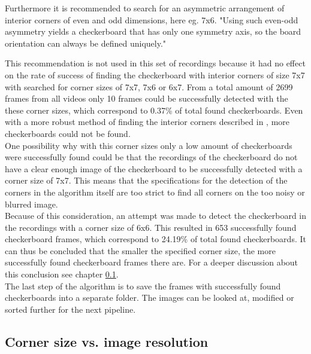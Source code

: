 Furthermore it is recommended to search for an asymmetric arrangement of interior corners of even and odd dimensions, here eg. 7x6. \cite{cv} "Using such even-odd asymmetry yields a checkerboard that has only one symmetry axis, so the board orientation can always be defined uniquely." \cite{cv}\\

\newpage

This recommendation is not used in this set of recordings because it had no effect on the rate of success of finding the checkerboard with interior corners of size 7x7 with searched for corner sizes of 7x7, 7x6 or 6x7. From a total amount of 2699 frames from all videos only 10 frames could be successfully detected with the these corner sizes, which correspond to 0.37\% of total found checkerboards. Even with a more robust method of finding the interior corners described in \cite{Geiger2012ICRA}, more checkerboards could not be found.\\

One possibility why with this corner sizes only a low amount of checkerboards were successfully found could be that the recordings of the checkerboard do not have a clear enough image of the checkerboard to be successfully detected with a corner size of 7x7. This means that the specifications for the detection of the corners in the algorithm itself are too strict to find all corners on the too noisy or blurred image.\\

Because of this consideration, an attempt was made to detect the checkerboard in the recordings with a corner size of 6x6. This resulted in 653 successfully found checkerboard frames, which correspond to 24.19\% of total found checkerboards. It can thus be concluded that the smaller the specified corner size, the more successfully found checkerboard frames there are. For a deeper discussion about this conclusion see chapter \ref{experiment}.\\

The last step of the algorithm is to save the frames with successfully found checkerboards into a separate folder. The images can be looked at, modified or sorted further for the next pipeline.\\
\vspace{-3mm}
\subsection{Corner size vs. image resolution}\label{experiment}


